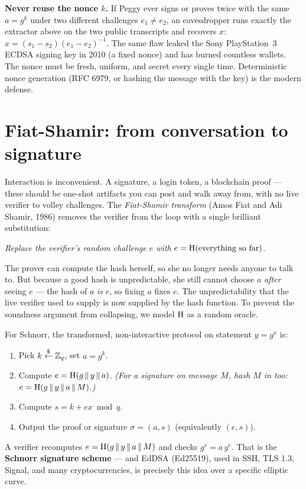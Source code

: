 \begin{trapbox}
\textbf{Never reuse the nonce $k$.} If Peggy ever signs or proves twice with the
same $a = g^k$ under two different challenges $e_1 \ne e_2$, an eavesdropper runs
exactly the extractor above on the two public transcripts and recovers $x$:
$x = (s_1 - s_2)(e_1 - e_2)^{-1}$. The same
flaw leaked the Sony PlayStation~3 ECDSA signing key in 2010 (a fixed nonce)
and has burned countless wallets. The nonce must be fresh, uniform, and secret
every single time. Deterministic nonce generation (RFC 6979, or hashing the
message with the key) is the modern defense.
\end{trapbox}

\section{Fiat-Shamir: from conversation to signature}
\label{ch31:fiat-shamir}

Interaction is inconvenient. A signature, a login token, a blockchain proof ---
these should be one-shot artifacts you can post and walk away from, with no live
verifier to volley challenges. The \emph{Fiat-Shamir transform} (Amos Fiat and
Adi Shamir, 1986) removes the verifier from the loop with a single brilliant
substitution:

\begin{center}
\emph{Replace the verifier's random challenge $e$ with}
$e = \operatorname{H}(\text{everything so far})$.
\end{center}

The prover can compute the hash herself, so she no longer needs anyone to talk
to. But because a good hash is unpredictable, she still cannot choose $a$
\emph{after} seeing $e$ --- the hash of $a$ \emph{is} $e$, so fixing $a$ fixes
$e$. The unpredictability that the live verifier used to supply is now supplied
by the hash function. To prevent the soundness argument from collapsing, we
model $\operatorname{H}$ as a random oracle.

For Schnorr, the transformed, non-interactive protocol on statement $y = g^x$ is:

\begin{enumerate}
  \item Pick $k \stackrel{\$}{\gets} \mathbb{Z}_q$, set $a = g^{k}$.
  \item Compute $e = \operatorname{H}(g \,\|\, y \,\|\, a)$. \emph{(For a signature on
        message $M$, hash $M$ in too:} $e = \operatorname{H}(g \,\|\, y \,\|\, a \,\|\,
        M)$.\emph{)}
  \item Compute $s = k + e x \bmod q$.
  \item Output the proof or signature $\sigma = (a, s)$ (equivalently $(e,s)$).
\end{enumerate}
A verifier recomputes $e = \operatorname{H}(g \,\|\, y \,\|\, a \,\|\, M)$ and checks
$g^{s} = a\, y^{e}$. That is the \textbf{Schnorr signature scheme} --- and EdDSA
(Ed25519), used in SSH, TLS 1.3, Signal, and many cryptocurrencies, is precisely
this idea over a specific elliptic curve.

